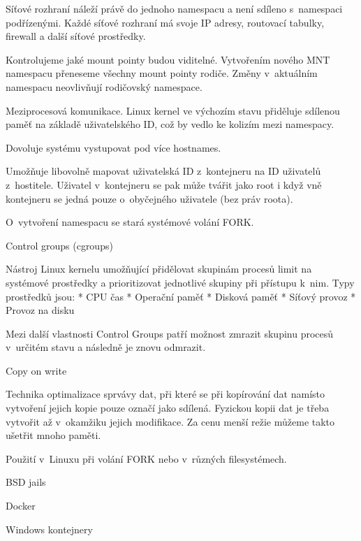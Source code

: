 \smallskip{}\break\noindent
Síťové rozhraní náleží právě do jednoho namespacu a není sdíleno s~namespaci podřízenými.
Každé síťové rozhraní má svoje IP adresy, routovací tabulky, firewall a další síťové prostředky. 

\smallskip{}\break\noindent
Kontrolujeme jaké mount pointy budou viditelné.
Vytvořením nového MNT namespacu přeneseme všechny mount pointy rodiče.
Změny v~aktuálním namespacu neovlivňují rodičovský namespace. 

\smallskip{}\break\noindent
Meziprocesová komunikace.
Linux kernel ve výchozím stavu přiděluje sdílenou paměť na základě uživatelského ID, což by vedlo ke kolizím mezi namespacy.


\smallskip{}\break\noindent
Dovoluje systému vystupovat pod více hostnames.

\smallskip{}\break\noindent
Umožňuje libovolně mapovat uživatelská ID z~kontejneru na ID uživatelů z~hostitele.
Uživatel v~kontejneru se pak může tvářit jako root i když vně kontejneru se jedná pouze o~obyčejného uživatele (bez práv roota).


O~vytvoření namespacu se stará systémové volání FORK.

\seccc Control groups (cgroups)

Nástroj Linux kernelu umožňující přidělovat skupinám procesů limit na systémové prostředky a prioritizovat jednotlivé skupiny při přístupu k~nim.
Typy prostředků jsou:
\begitems
* CPU čas
* Operační paměť
* Disková paměť %
* Síťový provoz
* Provoz na disku
\enditems

Mezi další vlastnosti Control Groups patří možnost zmrazit skupinu procesů v~určitém stavu a následně je znovu odmrazit. %


\seccc Copy on write

Technika optimalizace sprvávy dat, při které se při kopírování dat namísto vytvoření jejich kopie pouze označí jako sdílená.
Fyzickou kopii dat je třeba vytvořit až v~okamžiku jejich modifikace.
Za cenu menší režie můžeme takto ušetřit mnoho paměti.


Použití v~Linuxu při volání FORK nebo v~různých filesystémech.

\secc BSD jails


\secc Docker

\secc Windows kontejnery

